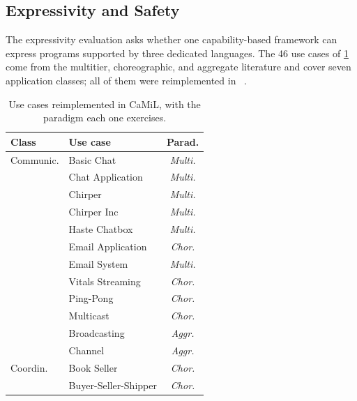\subsection{Expressivity and Safety}
\label{subsec:camil-expressivity}

The expressivity evaluation asks whether one capability-based framework can express programs supported by three dedicated languages.
%
The 46 use cases of \cref{tab:camil-use-cases} come from the multitier, choreographic, and aggregate literature and cover seven application classes;
all of them were reimplemented in \camil~\cite{Farabegoli:2026:CaMiL}.

\begin{table}[t]
    \centering
    \caption{Use cases reimplemented in CaMiL, with the paradigm each one exercises.}
    \label{tab:camil-use-cases}
    \scriptsize
    \begin{minipage}[t]{0.49\textwidth}
        \vspace{0pt}
        \begin{tabular}[t]{@{}llc@{}}
            \toprule
            \textbf{Class} & \textbf{Use case} & \textbf{Parad.} \\
            \midrule
            Communic. & Basic Chat & \emph{Multi.} \\
                      & Chat Application & \emph{Multi.} \\
                      & Chirper & \emph{Multi.} \\
                      & Chirper Inc & \emph{Multi.} \\
                      & Haste Chatbox & \emph{Multi.} \\
                      & Email Application & \emph{Chor.} \\
                      & Email System & \emph{Multi.} \\
                      & Vitals Streaming & \emph{Chor.} \\
                      & Ping-Pong & \emph{Chor.} \\
                      & Multicast & \emph{Chor.} \\
                      & Broadcasting & \emph{Aggr.} \\
                      & Channel & \emph{Aggr.} \\
            \midrule
            Coordin.  & Book Seller & \emph{Chor.} \\
                      & Buyer-Seller-Shipper & \emph{Chor.} \\

\end{tabular}
\end{minipage}
\end{table}
